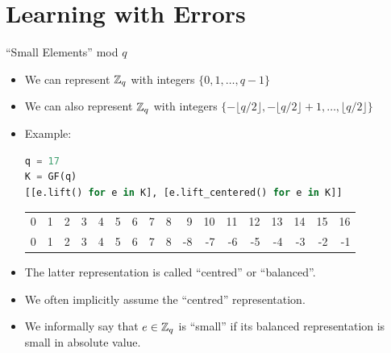 \documentclass[xcolor=table,10pt,aspectratio=169]{beamer}
\begin{document}
\section{Learning with Errors}
\label{sec:org6d8c186}
\begin{frame}[label={sec:org3a36eda},fragile]{``Small Elements'' mod \(q\)}
 \begin{itemize}
\item We can represent \(\mathbb{Z}_{q}\) with integers \(\{0, 1, \ldots, q-1\}\)
\item We can also represent \(\mathbb{Z}_{q}\) with integers \(\{-\lfloor q/2 \rfloor, -\lfloor q/2 \rfloor +1, \ldots, \lfloor q/2 \rfloor\}\)
\item Example:
\begin{lstlisting}[language=Python,numbers=none]
q = 17
K = GF(q)
[[e.lift() for e in K], [e.lift_centered() for e in K]]
\end{lstlisting}

\begin{table}[htbp]
\centering
\begin{tabular}{rrrrrrrrrrrrrrrrr}
\toprule
0 & 1 & 2 & 3 & 4 & 5 & 6 & 7 & 8 & 9 & 10 & 11 & 12 & 13 & 14 & 15 & 16\\
0 & 1 & 2 & 3 & 4 & 5 & 6 & 7 & 8 & -8 & -7 & -6 & -5 & -4 & -3 & -2 & -1\\
\bottomrule
\end{tabular}
\label{}

\end{table}

\item The latter representation is called ``centred'' or ``balanced''.
\item We often implicitly assume the ``centred'' representation.
\item We informally say that \(e \in \mathbb{Z}_{q}\) is ``small'' if its balanced representation is small in absolute value.
\end{itemize}
\end{frame}
\end{document}

